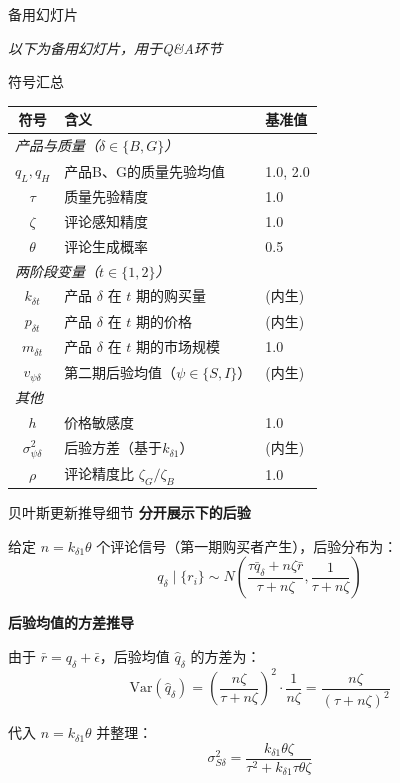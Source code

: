 \documentclass[aspectratio=169,10pt]{beamer}
\newcommand{\Var}{\mathrm{Var}}
\begin{document}
\appendix

\begin{frame}{备用幻灯片}
\begin{center}
\textit{以下为备用幻灯片，用于Q\&A环节}
\end{center}
\end{frame}

\begin{frame}{符号汇总}
\begin{center}
\small
\begin{tabular}{cll}
\toprule
\textbf{符号} & \textbf{含义} & \textbf{基准值} \\
\midrule
\multicolumn{3}{l}{\textit{产品与质量（$\delta \in \{B, G\}$）}} \\
$q_L, q_H$ & 产品B、G的质量先验均值 & 1.0, 2.0 \\
$\tau$ & 质量先验精度 & 1.0 \\
$\zeta$ & 评论感知精度 & 1.0 \\
$\theta$ & 评论生成概率 & 0.5 \\
\midrule
\multicolumn{3}{l}{\textit{两阶段变量（$t \in \{1, 2\}$）}} \\
$k_{\delta t}$ & 产品 $\delta$ 在 $t$ 期的购买量 & (内生) \\
$p_{\delta t}$ & 产品 $\delta$ 在 $t$ 期的价格 & (内生) \\
$m_{\delta t}$ & 产品 $\delta$ 在 $t$ 期的市场规模 & 1.0 \\
$v_{\psi\delta}$ & 第二期后验均值（$\psi \in \{S, I\}$） & (内生) \\
\midrule
\multicolumn{3}{l}{\textit{其他}} \\
$h$ & 价格敏感度 & 1.0 \\
$\sigma_{\psi\delta}^2$ & 后验方差（基于$k_{\delta 1}$） & (内生) \\
$\rho$ & 评论精度比 $\zeta_G/\zeta_B$ & 1.0 \\
\bottomrule
\end{tabular}
\end{center}
\end{frame}

\begin{frame}{贝叶斯更新推导细节}
\textbf{分开展示下的后验}

给定 $n = k_{\delta 1} \theta$ 个评论信号（第一期购买者产生），后验分布为：
\[
q_\delta \mid \{r_i\} \sim N\left(\frac{\tau \bar{q}_\delta + n\zeta\bar{r}}{\tau + n\zeta}, \frac{1}{\tau + n\zeta}\right)
\]

\vspace{6pt}
\textbf{后验均值的方差推导}

由于 $\bar{r} = q_\delta + \bar{\epsilon}$，后验均值 $\hat{q}_\delta$ 的方差为：
\[
\Var(\hat{q}_\delta) = \left(\frac{n\zeta}{\tau + n\zeta}\right)^2 \cdot \frac{1}{n\zeta} = \frac{n\zeta}{(\tau + n\zeta)^2}
\]

代入 $n = k_{\delta 1} \theta$ 并整理：
\[
\sigma_{S\delta}^2 = \frac{k_{\delta 1}\theta\zeta}{\tau^2 + k_{\delta 1}\tau\theta\zeta}
\]
\end{frame}
\end{document}
